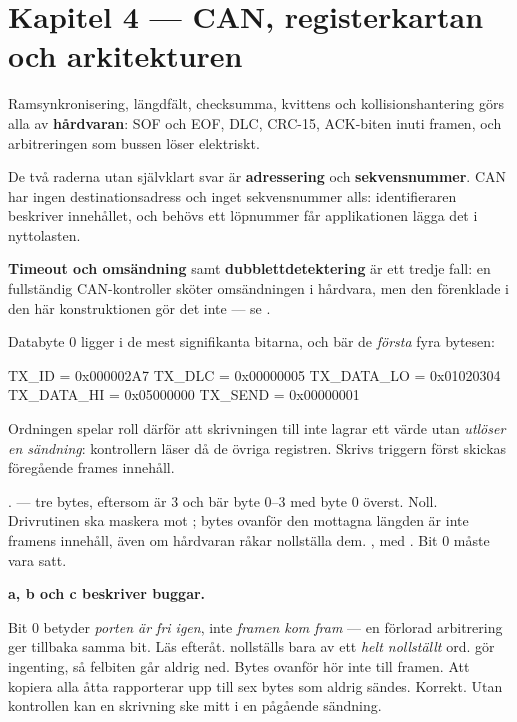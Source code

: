 \section*{Kapitel 4 --- CAN, registerkartan och arkitekturen}

Ramsynkronisering, längdfält, checksumma, kvittens och kollisionshantering görs alla av
\textbf{hårdvaran}: SOF och EOF, DLC, CRC-15, ACK-biten inuti framen, och arbitreringen som bussen
löser elektriskt.

De två raderna utan självklart svar är \textbf{adressering} och \textbf{sekvensnummer}. CAN har
ingen destinationsadress och inget sekvensnummer alls: identifieraren beskriver innehållet, och
behövs ett löpnummer får applikationen lägga det i nyttolasten.

\textbf{Timeout och omsändning} samt \textbf{dubblettdetektering} är ett tredje fall: en
fullständig CAN-kontroller sköter omsändningen i hårdvara, men den förenklade i den här
konstruktionen gör det inte --- se .

Databyte 0 ligger i de mest signifikanta bitarna, och  bär de \emph{första} fyra
bytesen:

\begin{console}
TX_ID      = 0x000002A7
TX_DLC     = 0x00000005
TX_DATA_LO = 0x01020304
TX_DATA_HI = 0x05000000
TX_SEND    = 0x00000001
\end{console}

Ordningen spelar roll därför att skrivningen till  inte lagrar ett värde utan
\emph{utlöser en sändning}: kontrollern läser då de övriga registren. Skrivs triggern först skickas
föregående frames innehåll.

 .
  --- tre bytes, eftersom  är 3 och  bär byte
0--3 med byte 0 överst.
 Noll. Drivrutinen ska maskera mot ; bytes ovanför den mottagna längden är inte
framens innehåll, även om hårdvaran råkar nollställa dem.
 , med . Bit 0 måste vara satt.

\textbf{a, b och c beskriver buggar.}

 Bit 0 betyder \emph{porten är fri igen}, inte \emph{framen kom fram} --- en förlorad
arbitrering ger tillbaka samma bit. Läs  efteråt.
  nollställs bara av ett \emph{helt nollställt} ord.  gör
ingenting, så felbiten går aldrig ned.
 Bytes ovanför  hör inte till framen. Att kopiera alla åtta rapporterar upp
till sex bytes som aldrig sändes.
 Korrekt. Utan kontrollen kan en skrivning ske mitt i en pågående sändning.

